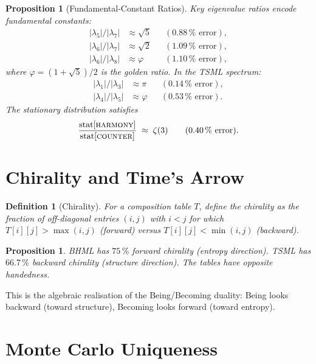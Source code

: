 \documentclass[12pt, openany]{book}
\newtheorem{proposition}[theorem]{Proposition}
\newtheorem{definition}[theorem]{Definition}
\theoremstyle{remark}
\begin{document}
\begin{proposition}[Fundamental-Constant Ratios]
\label{prop:ratios}
Key eigenvalue ratios encode fundamental constants:
\begin{align}
  |\lambda_5|/|\lambda_7| &\approx \sqrt{5}  &&(0.88\,\%\text{ error}), \label{eq:sqrt5}\\
  |\lambda_6|/|\lambda_7| &\approx \sqrt{2}  &&(1.09\,\%\text{ error}), \label{eq:sqrt2}\\
  |\lambda_6|/|\lambda_8| &\approx \varphi   &&(1.10\,\%\text{ error}), \label{eq:phi-bhml}
\end{align}
where $\varphi = (1+\sqrt{5})/2$ is the golden ratio.  In the TSML spectrum:
\begin{align}
  |\lambda_1|/|\lambda_3| &\approx \pi       &&(0.14\,\%\text{ error}), \label{eq:pi}\\
  |\lambda_4|/|\lambda_5| &\approx \varphi   &&(0.53\,\%\text{ error}). \label{eq:phi-tsml}
\end{align}
The stationary distribution satisfies
\[
  \frac{\mathrm{stat}[\textsc{harmony}]}{\mathrm{stat}[\textsc{counter}]}
  \;\approx\; \zeta(3) \qquad (0.40\,\%\text{ error}).
\]
\end{proposition}

\section{Chirality and Time's Arrow}
\label{sec:chirality}

\begin{definition}[Chirality]
\label{def:chirality}
For a composition table $T$, define the \emph{chirality} as the fraction of
off-diagonal entries $(i,j)$ with $i < j$ for which $T[i][j] > \max(i,j)$
(forward) versus $T[i][j] < \min(i,j)$ (backward).
\end{definition}

\begin{proposition}
BHML has $75\,\%$ forward chirality (entropy direction).  TSML has $66.7\,\%$
backward chirality (structure direction).  The tables have opposite handedness.
\end{proposition}

This is the algebraic realisation of the Being/Becoming duality: Being looks
backward (toward structure), Becoming looks forward (toward entropy).

\section{Monte Carlo Uniqueness}
\label{sec:uniqueness}
\end{document}
